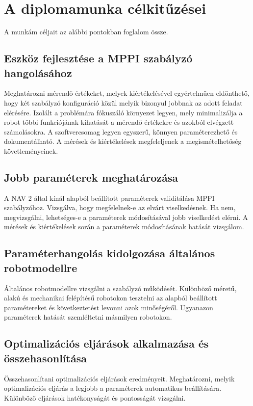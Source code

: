\section{A diplomamunka célkitűzései}
A munkám céljait az alábbi pontokban foglalom össze.
\subsection{Eszköz fejlesztése a MPPI szabályzó hangolásához}
Meghatározni mérendő értékeket, melyek kiértékelésével egyértelműen eldönthető, hogy két szabályzó konfiguráció közül melyik bizonyul jobbnak az adott feladat elérésére. Izolált a problémára fókuszáló környezet legyen, mely minimalizálja a robot többi funkciójának kihatását a mérendő értékekre és azokból elvégzett számolásokra. A szoftvercsomag legyen egyszerű, könnyen paraméterezhető és dokumentálható. A mérések és kiértékelések megfeleljenek a megismételhetőség követleményeinek.
\subsection{Jobb paraméterek meghatározása}
A NAV 2 által kínál alapból beállított paraméterek validitálása MPPI szabályzóhoz. Vizsgálva, hogy megfelelnek-e az elvárt viselkedésnek. Ha nem, megvizsgálni, lehetséges-e a paraméterek módosításával jobb viselkedést elérni. A mérések és kiértékelések során a paraméterek módosításának hatását vizsgálom.
\subsection{Paraméterhangolás kidolgozása általános robotmodellre}
Általános robotmodellre vizsgálni a szabályzó működését. Különböző méretű, alakú és mechanikai felépítésű robotokon tesztelni az alapból beállított paramétereket és következtetést levonni azok minőségéről. Ugyanazon paraméterek hatását szemléltetni másmilyen robotokon.
\subsection{Optimalizációs eljárások alkalmazása és összehasonlítása}
Összehasonlítani optimalizációs eljárások eredményeit. Meghatározni, melyik optimalizációs eljárás a legjobb a paraméterek automatikus beállítására. Különböző eljárások hatékonyságát és pontosságát vizsgálni.
